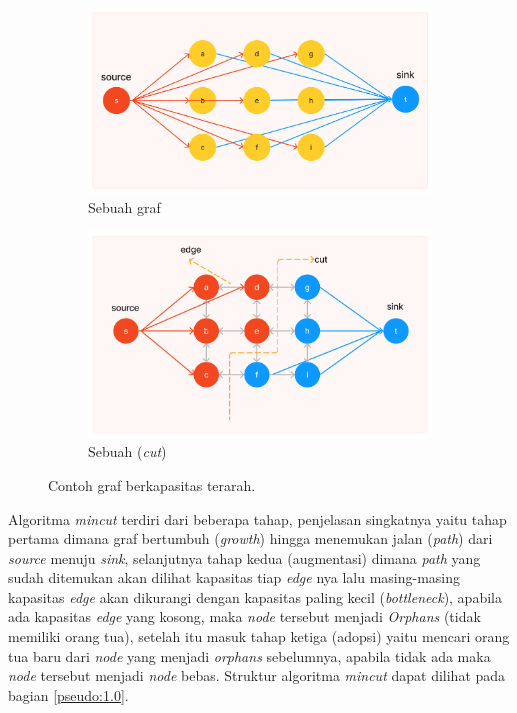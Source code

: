\begin{figure}[H]
	\centering
	  \begin{subfigure}{.5\textwidth}
		\centering{}
		\includegraphics[width=\textwidth]{gambar/cth-graph-1.png}
		\caption{Sebuah graf}
	  \end{subfigure} \hfill
	  \begin{subfigure}{.5\textwidth}
		\centering{}
		\includegraphics[width=\textwidth]{gambar/cth-graph-2.png}
		\caption{Sebuah (\emph{cut})}
	  \end{subfigure}  
	\caption{
	  Contoh graf berkapasitas terarah.
	  }
	\label{img:contoh_mincut}
  
  \end{figure}

Algoritma \emph{mincut} terdiri dari beberapa tahap, penjelasan singkatnya yaitu 
tahap pertama dimana graf bertumbuh (\emph{growth}) hingga menemukan jalan (\emph{path}) 
dari \emph{source} menuju \emph{sink}, selanjutnya tahap kedua (augmentasi) dimana 
\emph{path} yang sudah ditemukan akan dilihat kapasitas tiap \emph{edge} nya lalu 
masing-masing kapasitas \emph{edge} akan dikurangi dengan kapasitas paling kecil 
(\emph{bottleneck}), apabila ada kapasitas \emph{edge} yang kosong, maka \emph{node} 
tersebut menjadi \emph{Orphans} (tidak memiliki orang tua), setelah itu masuk tahap 
ketiga (adopsi) yaitu mencari orang tua baru dari \emph{node} yang menjadi \emph{orphans} 
sebelumnya, apabila tidak ada maka \emph{node} tersebut menjadi \emph{node} bebas. 
Struktur algoritma \emph{mincut} dapat dilihat pada bagian \ref{pseudo:1.0}. 

